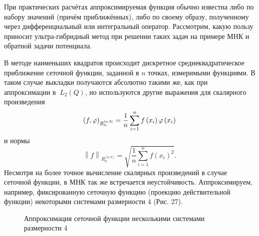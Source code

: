 ﻿\documentclass[a4paper, 12pt]{article}
\begin{document}
При практических расчётах аппроксимируемая функция обычно известна либо по набору значений (причём приближённых), либо по своему образу, полученному через дифференциальный или интегральный оператор. Рассмотрим, какую пользу приносит ультра-гибридный метод при решении таких задач на примере МНК и обратной задачи потенциала.

В методе наименьших квадратов происходит дискретное среднеквадратическое приближение сеточной функции, заданной в $n$ точках, измеримыми функциями. В таком случае выкладки получаются абсолютно такими же, как при аппроксимации в ${\ L}_2\left(Q\right)$, но используются другие выражения для скалярного произведения
\begin{equation}{\left(f,\varphi \right)}_{R^{\left[a,b\right]}_n}=\frac{1}{n}\sum^n_{i=1}{f\left(x_i\right)\varphi \left(x_i\right)}\\\end{equation} 
и нормы
\begin{equation}{\left\|f\right\|}_{R^{\left[a,b\right]}_n}=\sqrt{\frac{1}{n}\sum^n_{i=1}{f{\left(x_i\right)}^2}}.\end{equation} 
Несмотря на более точное вычисление скалярных произведений в случае сеточной функции, в МНК так же встречается неустойчивость. Аппроксимируем, например, фиксированную сеточную функцию (проекцию действительной функции) некоторыми системами размерности 4 (Рис. 27).

\begin{figure}[h!]
    \noindent{}
   \caption{Аппроксимация сеточной функции несколькими системами размерности 4}
    \label{figCurves}
\end{figure}
\end{document}

